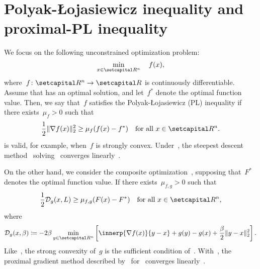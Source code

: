 \documentclass[../main]{subfiles}
\begin{document}
\section{Polyak-{\L}ojasiewicz inequality and proximal-PL inequality} 
We focus on the following unconstrained optimization problem:
\begin{equation} \label{eq:differentiable_OP}
    \min_{x \in \setR^n} \quad f(x)
,\end{equation}
where~$f \colon \setR^n \to \setR$ is continuously differentiable.
Assume that  has an optimal solution, and let~$f^*$ denote the optimal function value.
Then, we say that~$f$ satisfies the Polyak-{\L}ojasiewicz (PL) inequality if there exists~$\mu_f > 0$ such that
\begin{equation} \label{eq:PL}
    \frac{1}{2} \norm{\nabla f(x)}_2^2 \ge \mu_f (f(x) - f^*) \forallcondition{x \in \setR^n}
.\end{equation}
 is valid, for example, when~$f$ is strongly convex.
Under~, the steepest descent method~\cite{Cauchy1847} solving~ converges linearly~\cite{Polyak1963}.

On the other hand, we consider the composite optimization~, supposing that~$F^*$ denotes the optimal function value.
If there exists~$\mu_{f, g} > 0$ such that
\begin{equation} \label{eq:proximal_PL}
    \frac{1}{2} \mathcal{D}_g(x, L) \ge \mu_{f, g} (F(x) - F^*) \forallcondition{x \in \setR^n}
,\end{equation}
where
\begin{equation}
    \mathcal{D}_g(x, \beta) \coloneqq - 2 \beta \min_{y \in \setR^n} \left[ \innerp{\nabla f(x)}{y - x} + g(y) - g(x) + \frac{\beta}{2} \norm{y - x}_2^2 \right] 
.\end{equation}
Like~, the strong convexity of~$g$ is the sufficient condition of~.
With~, the proximal gradient method described by~ for~ converges linearly~\cite{Karimi2016}.
\end{document}
